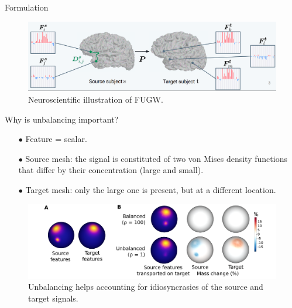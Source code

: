 \documentclass{beamer}
\begin{document}
\begin{frame}{Formulation}
\vspace{-0.5cm}
\begin{figure}
  \centering
  \includegraphics[width=1.\linewidth, keepaspectratio=true]{OT_new/fugw.png}
  \caption*{\scriptsize{Neuroscientific illustration of FUGW.}}
\end{figure}
\end{frame}

\begin{frame}{Why is unbalancing important?}
\scriptsize
\begin{itemize}
  \item[$\bullet$] Feature = scalar.
  \item[$\bullet$] Source mesh: the signal is constituted of two von Mises
  density functions that differ by their concentration (large and small).
  \item[$\bullet$] Target mesh: only the large one is present, but at a different location.
\end{itemize}
\vspace{0.2cm}
\begin{figure}
  \centering
  \includegraphics[width=1.\linewidth, keepaspectratio=true]{OT_new/toy_example.pdf}
  \caption*{\scriptsize{Unbalancing helps accounting for idiosyncrasies of the source and target signals.}}
\end{figure}


\end{frame}
\end{document}
